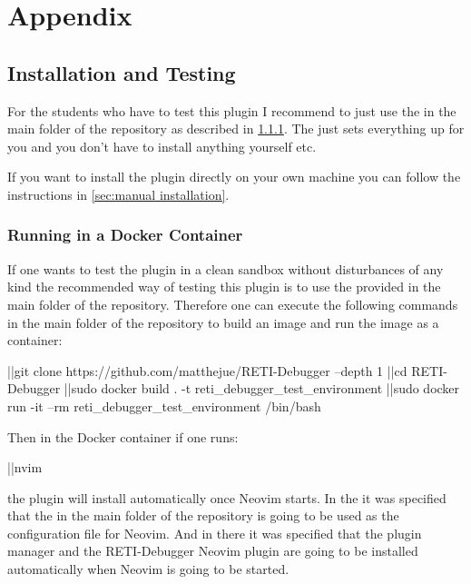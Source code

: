 \documentclass{report}
\begin{document}
\clearpage
\chapter{Appendix}

\section{Installation and Testing}

For the students who have to test this plugin I recommend to just use the  in the main folder of the repository as described in \ref{sec:running in a docker image}. The  just sets everything up for you and you don't have to install anything yourself etc.

If you want to install the plugin directly on your own machine you can follow the instructions in \ref{sec:manual installation}.

\subsection{Running in a Docker Container}
\label{sec:running in a docker image}

If one wants to test the plugin in a clean sandbox without disturbances of any kind the recommended way of testing this plugin is to use the provided  in the main folder of the repository. Therefore one can execute the following commands in the main folder of the repository to build an \alert{image} and run the image as a \alert{container}:

\begin{terminal}
  |\prompt|git clone https://github.com/matthejue/RETI-Debugger --depth 1
  |\prompt|cd RETI-Debugger
  |\prompt|sudo docker build . -t reti_debugger_test_environment
  |\prompt|sudo docker run -it --rm reti_debugger_test_environment /bin/bash
\end{terminal}

Then in the Docker container if one runs:

\begin{terminal}
	|\prompt|nvim
\end{terminal}

the plugin will install automatically once Neovim starts. In the  it was specified that the  in the main folder of the repository is going to be used as the configuration file  for Neovim. And in there it was specified that the \alert{plugin manager}  and the RETI-Debugger Neovim plugin are going to be installed automatically when Neovim is going to be started.
\end{document}
